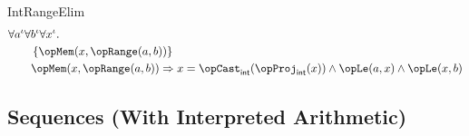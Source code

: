 \documentclass[11pt, a4paper, oneside]{article}
\begin{document}
\begin{axioms}
\item[IntRangeElim] \[
        \begin{aligned}
            &\forall a^\idv \forall b^\idv \forall x^\idv. \\
            &\qquad \st{ \opMem(x, \opRange(a, b)) } \\
            &\qquad \opMem(x, \opRange(a, b)) \imp x = \opCast_\int(\opProj_\int(x)) \wedge \opLe(a, x) \wedge \opLe(x, b)
        \end{aligned}
    \]

\end{axioms}


    \subsection{Sequences (With Interpreted Arithmetic)}
    \label{subsec:seqs_interpreted}
\end{document}
